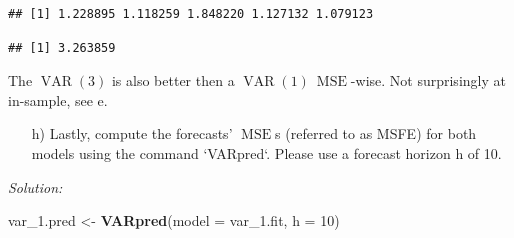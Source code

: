 \documentclass[12pt,a4paper]{article}
\newcommand{\MSE}{\operatorname{MSE}} %
\newcommand{\VAR}{\operatorname{VAR}} %
\newenvironment{Shaded}{\begin{snugshade}}{\end{snugshade}}
\newcommand{\DataTypeTok}[1]{\textcolor[rgb]{0.13,0.29,0.53}{#1}}
\newcommand{\DecValTok}[1]{\textcolor[rgb]{0.00,0.00,0.81}{#1}}
\newcommand{\FloatTok}[1]{\textcolor[rgb]{0.00,0.00,0.81}{#1}}
\newcommand{\KeywordTok}[1]{\textcolor[rgb]{0.13,0.29,0.53}{\textbf{#1}}}
\newcommand{\NormalTok}[1]{#1}
\newcommand{\OperatorTok}[1]{\textcolor[rgb]{0.81,0.36,0.00}{\textbf{#1}}}
\newcommand{\StringTok}[1]{\textcolor[rgb]{0.31,0.60,0.02}{#1}}
\begin{document}
\begin{Shaded}
\end{Shaded}

\begin{verbatim}
## [1] 1.228895 1.118259 1.848220 1.127132 1.079123
\end{verbatim}

\begin{Shaded}
\end{Shaded}

\begin{verbatim}
## [1] 3.263859
\end{verbatim}

The \(\VAR(3)\) is also better then a \(\VAR(1) \ \MSE\)-wise. Not
surprisingly at in-sample, see e.

\begin{itemize}
  \item[h)] Lastly, compute the forecasts’ $\MSE$s (referred to as MSFE) for both models using the command `VARpred`. Please use a forecast horizon h of 10.
\end{itemize}

\emph{Solution:}

\begin{Shaded}
\begin{Highlighting}[]
\NormalTok{var_}\FloatTok{1.}\NormalTok{pred <-}\StringTok{ }\KeywordTok{VARpred}\NormalTok{(}\DataTypeTok{model =}\NormalTok{ var_}\FloatTok{1.}\NormalTok{fit, }\DataTypeTok{h =} \DecValTok{10}\NormalTok{)}
\end{Highlighting}
\end{Shaded}
\end{document}
